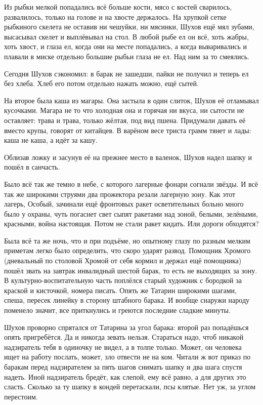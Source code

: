 Из рыбки мелкой попадались всё больше кости, мясо с костей сварилось, развалилось, только на
голове и на хвосте держалось. На хрупкой сетке рыбкиного скелета не оставив ни чешуйки, ни
мясинки, Шухов ещё мял зубами, высасывал скелет \dash и выплёвывал на стол. В любой рыбе ел он
всё, хоть жабры, хоть хвост, и глаза ел, когда они на месте попадались, а когда вываривались и
плавали в миске отдельно \dash большие рыбьи глаза \dash не ел. Над ним за то смеялись.

Сегодня Шухов сэкономил: в барак не зашедши, пайки не получил и теперь ел без хлеба. Хлеб \dash
его потом отдельно нажать можно, ещё сытей.

На второе была каша из магары. Она застыла в один слиток, Шухов её отламывал кусочками.
Магара не то что холодная \dash она и горячая ни вкуса, ни сытости не оставляет: трава и трава,
только жёлтая, под вид пшена. Придумали давать её вместо крупы, говорят \dash от китайцев. В
варёном весе триста грамм тянет \dash и лады: каша не каша, а идёт за кашу.

Облизав ложку и засунув её на прежнее место в валенок, Шухов надел шапку и пошёл в санчасть.

Было всё так же темно в небе, с которого лагерные фонари согнали звёзды. И всё так же широкими
струями два прожектора резали лагерную зону. Как этот лагерь, Особый, зачинали \dash ещё
фронтовых ракет осветительных больно много было у охраны, чуть погаснет свет \dash сыпят
ракетами над зоной, белыми, зелёными, красными, война настоящая. Потом не стали ракет кидать.
Или дороги обходятся?

Была всё та же ночь, что и при подъёме, но опытному глазу по разным мелким приметам легко было
определить, что скоро ударят развод. Помощник Хромого (дневальный по столовой Хромой от себя
кормил и держал ещё помощника) пошёл звать на завтрак инвалидный шестой барак, то есть не
выходящих за зону. В культурно-воспитательную часть поплёлся старый художник с бородкой \dash
за краской и кисточкой, номера писать. Опять же Татарин широкими шагами, спеша, пересек
линейку в сторону штабного барака. И вообще снаружи народу поменело \dash значит, все
приткнулись и греются последние сладкие минуты.

Шухов проворно спрятался от Татарина за угол барака: второй раз попадёшься \dash опять
пригребётся. Да и никогда зевать нельзя. Стараться надо, чтоб никакой надзиратель тебя в
одиночку не видел, а в толпе только. Может, он человека ищет на работу послать, может, зло
отвести не на ком. Читали ж вот приказ по баракам \dash перед надзирателем за пять шагов снимать
шапку и два шага спустя надеть. Иной надзиратель бредёт, как слепой, ему всё равно, а для
других это сласть. Сколько за ту шапку в кондей перетаскали, псы клятые. Нет уж, за углом
перестоим.

